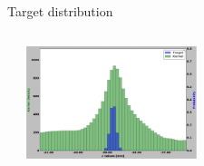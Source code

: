 \begin{frame}{Target distribution}
\begin{columns}
\begin{center}
      \end{center}
      \begin{center}
        \includegraphics[height=3.3cm,trim=18 0 18 0]{images/T_4_25.png}
      \end{center}
  \end{columns}


\end{frame}
